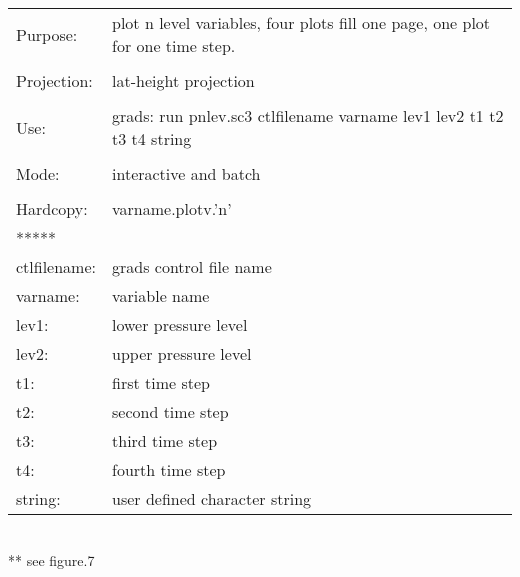 \begin{tabular}{ll}
Purpose:     &  plot n level variables, four plots fill one page, one plot for one time step.\\
\\
Projection:  &  lat-height projection                                                  \\
\\
Use:         &  grads: run pnlev.sc3 ctlfilename varname lev1 lev2 t1 t2 t3 t4 string  \\
\\
Mode:        &  interactive and batch                                                  \\
\\
Hardcopy:    &  varname.plotv.'n'                                                      \\
*****  \\
ctlfilename: &  grads control file name  \\                                    
varname:     &  variable name            \\               
lev1:     &  lower pressure level        \\
lev2:     &  upper pressure level        \\
t1:       &  first time step             \\  
t2:       &  second time step            \\
t3:       &  third time step             \\  
t4:       &  fourth time step            \\
string:   &  user defined character string  
\end{tabular}
\\
** see figure.7
\\
\\
\\

